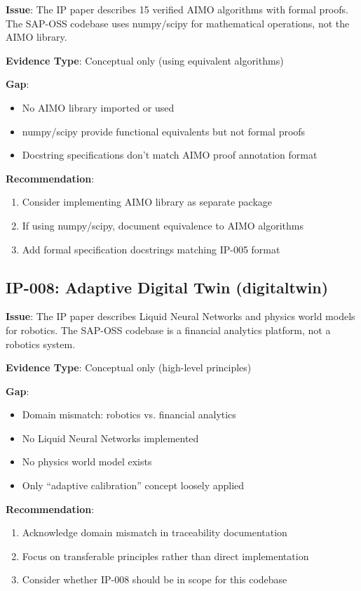 \begin{tcolorbox}[colback=red!5,colframe=red!70,title=\faIcon{exclamation-triangle} Weak Traceability: IP-005]
\textbf{Issue}: The IP paper describes 15 verified AIMO algorithms with formal proofs. The SAP-OSS codebase uses numpy/scipy for mathematical operations, not the AIMO library.

\textbf{Evidence Type}: Conceptual only (using equivalent algorithms)

\textbf{Gap}: 
\begin{itemize}[nosep]
    \item No AIMO library imported or used
    \item numpy/scipy provide functional equivalents but not formal proofs
    \item Docstring specifications don't match AIMO proof annotation format
\end{itemize}

\textbf{Recommendation}: 
\begin{enumerate}[nosep]
    \item Consider implementing AIMO library as separate package
    \item If using numpy/scipy, document equivalence to AIMO algorithms
    \item Add formal specification docstrings matching IP-005 format
\end{enumerate}
\end{tcolorbox}

\subsection{IP-008: Adaptive Digital Twin (digitaltwin)}

\begin{tcolorbox}[colback=red!5,colframe=red!70,title=\faIcon{exclamation-triangle} Weak Traceability: IP-008]
\textbf{Issue}: The IP paper describes Liquid Neural Networks and physics world models for robotics. The SAP-OSS codebase is a financial analytics platform, not a robotics system.

\textbf{Evidence Type}: Conceptual only (high-level principles)

\textbf{Gap}: 
\begin{itemize}[nosep]
    \item Domain mismatch: robotics vs. financial analytics
    \item No Liquid Neural Networks implemented
    \item No physics world model exists
    \item Only ``adaptive calibration'' concept loosely applied
\end{itemize}

\textbf{Recommendation}: 
\begin{enumerate}[nosep]
    \item Acknowledge domain mismatch in traceability documentation
    \item Focus on transferable principles rather than direct implementation
    \item Consider whether IP-008 should be in scope for this codebase
\end{enumerate}
\end{tcolorbox}

